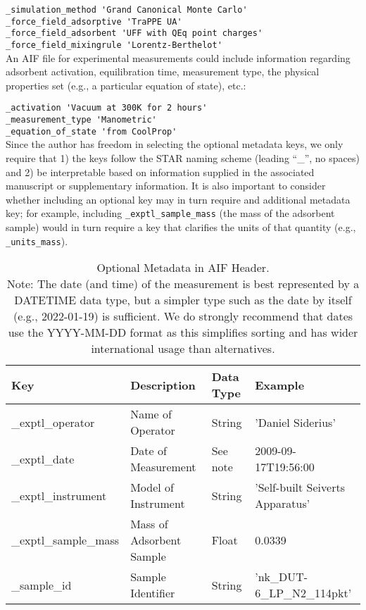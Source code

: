 \documentclass[preprint,pre,showkeys,12pt,superscriptaddress,nofootinbib,endfloats*]{revtex4-1}
\begin{document}
\noindent\verb!_simulation_method 'Grand Canonical Monte Carlo'!\\
\verb!_force_field_adsorptive 'TraPPE UA'!\\
\verb!_force_field_adsorbent 'UFF with QEq point charges'!\\
\verb!_force_field_mixingrule 'Lorentz-Berthelot'!\\

\noindent An AIF file for experimental measurements could include information regarding adsorbent activation, equilibration time, measurement type, the physical properties set (e.g., a particular equation of state), etc.:\newline

\noindent\verb!_activation 'Vacuum at 300K for 2 hours'!\\
\verb!_measurement_type 'Manometric'!\\
\verb!_equation_of_state 'from CoolProp'!\\

\noindent Since the author has freedom in selecting the optional metadata keys, we only require that 1) the keys follow the STAR naming scheme (leading ``\_'', no spaces) and 2) be interpretable based on information supplied in the associated manuscript or supplementary information. It is also important to consider whether including an optional key may in turn require and additional metadata key; for example, including \verb!_exptl_sample_mass! (the mass of the adsorbent sample) would in turn require a key that clarifies the units of that quantity (e.g., \verb!_units_mass!).

\begin{table}%
  \begin{center}
    \label{tab:meta_opt}
    \begin{tabular}{l|l|l|l}
      \textbf{Key} & \textbf{Description} & \textbf{Data Type} & \textbf{Example}\\
      \hline
      \_exptl\_operator & Name of Operator & String & 'Daniel Siderius' \\
      \_exptl\_date & Date of Measurement & See note & 2009-09-17T19:56:00 \\
      \_exptl\_instrument & Model of Instrument & String & 'Self-built Seiverts Apparatus' \\
      \_exptl\_sample\_mass & Mass of Adsorbent Sample & Float & 0.0339 \\
      \_sample\_id & Sample Identifier & String & 'nk\_DUT-6\_LP\_N2\_114pkt'
    \end{tabular}
    \caption{Optional Metadata in AIF Header. \\
      Note: The date (and time) of the measurement is best represented by a DATETIME data type, but a simpler type such as the date by itself (e.g., 2022-01-19) is sufficient. We do strongly recommend that dates use the YYYY-MM-DD format as this simplifies sorting and has wider international usage than alternatives.
      }
  \end{center}
\end{table}
\end{document}
